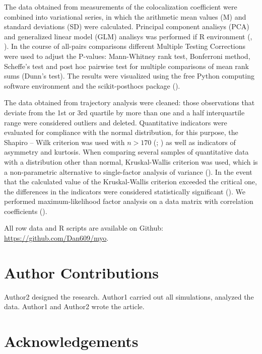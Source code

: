 \documentclass[alpha-refs]{wiley-article}
\begin{document}
The data obtained from measurements of the colocalization coefficient were combined into variational series, in which the arithmetic mean values (M) and standard deviations (SD) were calculated.
Principal component analisys (PCA)  and generalized linear model (GLM) analisys was performed if R environment (\cite{husson2010exploratory}, \cite{dobson2008introduction}).
In the course of all-pairs comparisons different Multiple Testing Corrections were used to adjust the P-values: Mann-Whitney rank test, Bonferroni method, Scheffe’s test and post hoc pairwise test for multiple comparisons of mean rank sums (Dunn’s test).
The results were visualized using the free Python computing software environment and the scikit-posthocs package (\cite{Terpilowski2019}).


The data obtained from trajectory analysis were cleaned: those observations that deviate from the 1st or 3rd quartile by more than one and a half interquartile range were considered outliers and deleted.
Quantitative indicators were evaluated for compliance with the normal distribution, for this purpose, the Shapiro – Wilk criterion  was used with $n > 170$ (\cite{shapiro1965analysis}; \cite{shapiro1972approximate}) as well as indicators of asymmetry and kurtosis.
When comparing several samples of quantitative data with a distribution other than normal, Kruskal-Wallis criterion was used, which is a non-parametric alternative to single-factor analysis of variance (\cite{kruskal1952use}).
In the event that the calculated value of the Kruskal-Wallis criterion exceeded the critical one, the differences in the indicators were considered statistically significant (\cite{wilcoxon1992individual}).
We performed maximum-likelihood factor analysis on a data matrix with correlation coefficients (\cite{lawley1971factor}).

All row data and R scripts are available on Github: \url{https://github.com/Dan609/myo}.


\section*{Author Contributions}

Author2 designed the research. Author1 carried out all simulations, analyzed the data. Author1 and Author2 wrote the article.

\section*{Acknowledgements}
\end{document}
